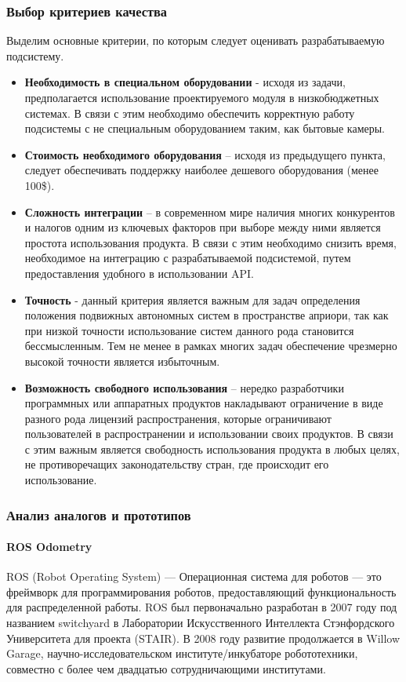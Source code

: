 \subsubsection{Выбор критериев качества}
Выделим основные критерии, по которым следует оценивать разрабатываемую подсистему.
\begin{itemize}
\item \textbf{Необходимость в специальном оборудовании} - исходя из задачи, предполагается использование проектируемого модуля в низкобюджетных системах. В связи с этим необходимо обеспечить корректную работу подсистемы с не специальным оборудованием таким, как бытовые камеры. 
\item \textbf{Стоимость необходимого оборудования} – исходя из предыдущего пункта, следует обеспечивать поддержку наиболее дешевого оборудования (менее 100\$). 
\item \textbf{Сложность интеграции} – в современном мире наличия многих конкурентов и налогов одним из ключевых факторов при выборе между ними является простота использования продукта. В связи с этим необходимо снизить время, необходимое на интеграцию с разрабатываемой подсистемой, путем предоставления удобного в использовании API.
\item \textbf{Точность} - данный критерия является важным для задач определения положения подвижных автономных систем в пространстве априори, так как при низкой точности использование систем данного рода становится бессмысленным. Тем не менее в рамках многих задач обеспечение чрезмерно высокой точности является избыточным.
\item \textbf{Возможность свободного использования} – нередко разработчики программных или аппаратных продуктов накладывают ограничение в виде разного рода лицензий распространения, которые ограничивают пользователей в распространении и использовании своих продуктов. В связи с этим важным является свободность использования продукта в любых целях, не  противоречащих законодательству стран, где происходит его использование.
\end{itemize}

\subsubsection{Анализ аналогов и прототипов}

\paragraph{ROS Odometry}
ROS (Robot Operating System) — Операционная система для роботов — это фреймворк для программирования роботов, предоставляющий функциональность для распределенной работы. ROS был первоначально разработан в 2007 году под названием switchyard в Лаборатории Искусственного Интеллекта Стэнфордского Университета для проекта (STAIR). В 2008 году развитие продолжается в Willow Garage, научно-исследовательском институте/инкубаторе робототехники, совместно с более чем двадцатью сотрудничающими институтами.

